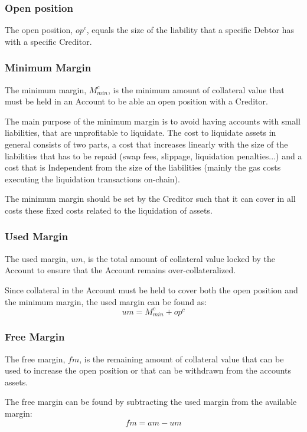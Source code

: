 \documentclass[sigconf,nonacm]{acmart}
\begin{document}
\subsubsection{Open position}
The open position, $op^c$, equals the size of the liability that a specific Debtor has with a specific Creditor.

\subsubsection{Minimum Margin}
The minimum margin, $M_{min}^c$, is the minimum amount of collateral value that must be held in an Account to be able an open position with a Creditor.

The main purpose of the minimum margin is to avoid having accounts with small liabilities, that are unprofitable to liquidate.
The cost to liquidate assets in general consists of two parts, a cost that increases linearly with the size of the liabilities that has to be repaid (swap fees, slippage, liquidation penalties...)
and a cost that is Independent from the size of the liabilities (mainly the gas costs executing the liquidation transactions on-chain).

The minimum margin should be set by the Creditor such that it can cover in all costs these fixed costs related to the liquidation of assets.

\subsubsection{Used Margin}
The used margin, $um$, is the total amount of collateral value locked by the Account to ensure that the Account remains over-collateralized.

Since collateral in the Account must be held to cover both the open position and the minimum margin, the used margin can be found as:
\begin{equation}
    um = M_{min}^c + op^c
\end{equation}

\subsubsection{Free Margin}
The free margin, $fm$, is the remaining amount of collateral value that can be used to increase the open position or that can be withdrawn from the accounts assets.

The free margin can be found by subtracting the used margin from the available margin:
\begin{equation}
    \label{eq:free-margin}
    fm = am - um
\end{equation}
\end{document}
